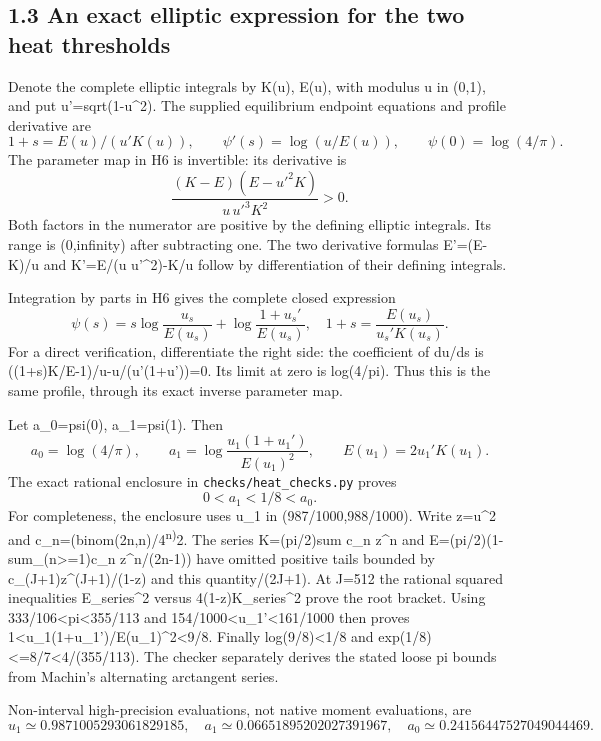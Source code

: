 \documentclass[11pt]{article}
\begin{document}
\subsection{1.3 An exact elliptic expression for the two heat thresholds}\label{an-exact-elliptic-expression-for-the-two-heat-thresholds}

Denote the complete elliptic integrals by K(u), E(u), with modulus u in (0,1), and put u'=sqrt(1-u\^{}2). The supplied equilibrium endpoint equations and profile derivative are \[
 1+s=E(u)/(u'K(u)),\qquad \psi'(s)=\log(u/E(u)),\qquad \psi(0)=\log(4/\pi).
 \tag{H6}
\] The parameter map in H6 is invertible: its derivative is \[
 \frac{(K-E)(E-u'^2K)}{u\,u'^3K^2}>0.
\] Both factors in the numerator are positive by the defining elliptic integrals. Its range is (0,infinity) after subtracting one. The two derivative formulas E'=(E-K)/u and K'=E/(u u'\^{}2)-K/u follow by differentiation of their defining integrals.

Integration by parts in H6 gives the complete closed expression \[
 \boxed{\psi(s)=s\log\frac{u_s}{E(u_s)}+
                   \log\frac{1+u_s'}{E(u_s)},\quad
       1+s=\frac{E(u_s)}{u_s'K(u_s)}.}
 \tag{H7}
\] For a direct verification, differentiate the right side: the coefficient of du/ds is ((1+s)K/E-1)/u-u/(u'(1+u'))=0. Its limit at zero is log(4/pi). Thus this is the same profile, through its exact inverse parameter map.

Let a\_0=psi(0), a\_1=psi(1). Then \[
 a_0=\log(4/\pi),\qquad
 a_1=\log\frac{u_1(1+u_1')}{E(u_1)^2},\qquad
 E(u_1)=2u_1'K(u_1).
 \tag{H8}
\] The exact rational enclosure in \nolinkurl{checks/heat_checks.py} proves \[
 \boxed{0<a_1<1/8<a_0.}\tag{H9}
\] For completeness, the enclosure uses u\_1 in (987/1000,988/1000). Write z=u\^{}2 and c\_n=(binom(2n,n)/4\textsuperscript{n)}2. The series K=(pi/2)sum c\_n z\^{}n and E=(pi/2)(1-sum\_(n\textgreater=1)c\_n z\^{}n/(2n-1)) have omitted positive tails bounded by c\_(J+1)z\^{}(J+1)/(1-z) and this quantity/(2J+1). At J=512 the rational squared inequalities E\_series\^{}2 versus 4(1-z)K\_series\^{}2 prove the root bracket. Using 333/106\textless pi\textless355/113 and 154/1000\textless u\_1'\textless161/1000 then proves 1\textless u\_1(1+u\_1')/E(u\_1)\^{}2\textless9/8. Finally log(9/8)\textless1/8 and exp(1/8)\textless=8/7\textless4/(355/113). The checker separately derives the stated loose pi bounds from Machin's alternating arctangent series.

Non-interval high-precision evaluations, not native moment evaluations, are \[
 u_1\simeq0.9871005293061829185,\quad
 a_1\simeq0.06651895202027391967,\quad
 a_0\simeq0.24156447527049044469.
\]
\end{document}
